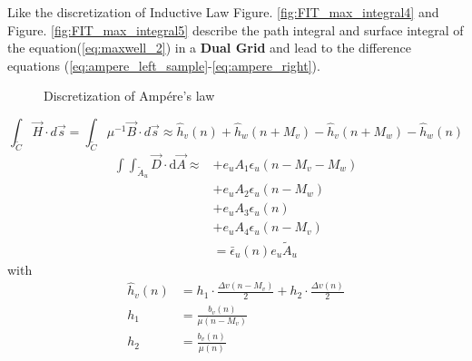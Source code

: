 Like the discretization of Inductive Law Figure. \ref{fig:FIT_max_integral4} and Figure.  \ref{fig:FIT_max_integral5} describe the path integral and surface integral of the equation(\ref{eq:maxwell_2}) in a \textbf{Dual Grid} and lead to the difference equations (\ref{eq:ampere_left_sample}-\ref{eq:ampere_right}).
\begin{figure}
\hfill
\caption{Discretization of Amp\'ere's law}
\end{figure}

\begin{equation}
\int_{\tilde{C}}\vec{H}\cdot d\vec{s}=\int_{\tilde{C}}\mu^{-1}\vec{B}\cdot d\vec{s}\approx
\widehat{h}_{v}(n)
+\widehat{h}_{w}(n+M_{v})
-\widehat{h}_{v}(n+M_{w})
-\widehat{h}_{w}(n)
\label{eq:ampere_left_sample}
\end{equation}
\begin{align}
\int\int_{\tilde{A}_{u}}\vec{D}\cdot\mathrm{d}\vec{A}\approx &+e_{u}A_{1}\epsilon_{u}(n-M_{v}-M_{w}) \nonumber\\
&+e_{u}A_{2}\epsilon_{u}(n-M_{w}) \nonumber\\
&+e_{u}A_{3}\epsilon_{u}(n) \nonumber\\
&+e_{u}A_{4}\epsilon_{u}(n-M_{v}) \nonumber\\
&=\bar{\epsilon}_{u}(n)e_{u}\tilde{A}_{u}
\label{eq:ampere_right}
\end{align}
with 
\begin{align}
\widehat{h}_{v}(n)&=h_{1}\cdot\frac{\Delta v(n-M_{v})}{2}+ h_{2}\cdot\frac{\Delta v(n)}{2}\\
h_{1}&=\frac{b_{v}(n)}{\mu (n-M_{v})}\\
h_{2}&=\frac{b_{v}(n)}{\mu (n)}
\label{eq:megnetic_field}
\end{align}

